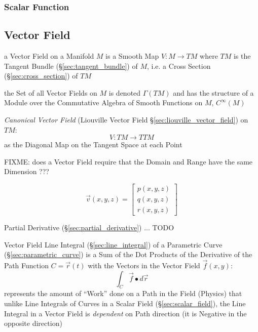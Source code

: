 \subsubsection{Scalar Function}\label{sec:scalar_function}



\subsection{Vector Field}\label{sec:vector_field}

a Vector Field on a Manifold $M$ is a Smooth Map $V : M \rightarrow T M$ where
$TM$ is the Tangent Bundle (\S\ref{sec:tangent_bundle}) of $M$, i.e. a Cross
Section (\S\ref{sec:cross_section}) of $TM$

the Set of all Vector Fields on $M$ is denoted $\Gamma(TM)$ and has the
structure of a Module over the Commutative Algebra of Smooth Functions on $M$,
$C^\infty(M)$

\emph{Canonical Vector Field} (Liouville Vector Field
\S\ref{sec:liouville_vector_field}) on $TM$:
\[
  V : TM \rightarrow TTM
\]
as the Diagonal Map on the Tangent Space at each Point

FIXME: does a Vector Field require that the Domain and Range have the same
Dimension ???

\begin{equation*}
  \vec{v}(x,y,z) = \begin{bmatrix}
    p(x,y,z) \\
    q(x,y,z) \\
    r(x,y,z)
  \end{bmatrix}
\end{equation*}

Partial Derivative (\S\ref{sec:partial_derivative}) ... TODO

Vector Field Line Integral (\S\ref{sec:line_integral}) of a Parametric Curve
(\S\ref{sec:parametric_curve}) is a Sum of the Dot Products of the Derivative
of the Path Function $C = \vec{r}(t)$ with the Vectors in the Vector Field
$\vec{f}(x,y)$:
\[
  \int_C \vec{f} \bullet d\vec{r}
\]
represents the amount of ``Work'' done on a Path in the Field (Physics)
that unlike Line Integrals of Curves in a Scalar Field
(\S\ref{sec:scalar_field}), the Line Integral in a Vector Field is
\emph{dependent} on Path direction (it is Negative in the opposite direction)

